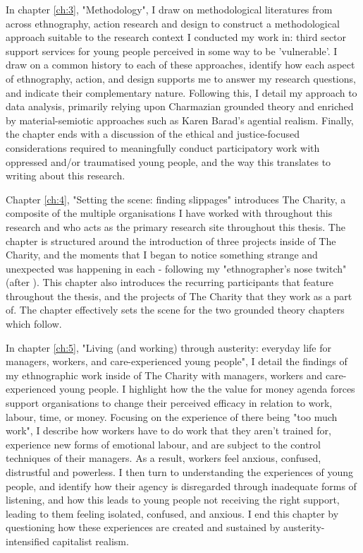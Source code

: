 In chapter \ref{ch:3}, "Methodology", I draw on methodological literatures from across ethnography, action research and design to construct a methodological approach suitable to the research context I conducted my work in: third sector support services for young people perceived in some way to be 'vulnerable'. I draw on a common history to each of these approaches, identify how each aspect of ethnography, action, and design supports me to answer my research questions, and indicate their complementary nature. Following this, I detail my approach to data analysis, primarily relying upon Charmazian grounded theory and enriched by material-semiotic approaches such as Karen Barad's agential realism. Finally, the chapter ends with a discussion of the ethical and justice-focused considerations required to meaningfully conduct participatory work with oppressed and/or traumatised young people, and the way this translates to writing about this research. 

Chapter \ref{ch:4}, "Setting the scene: finding slippages" introduces The Charity, a composite of the multiple organisations I have worked with throughout this research and who acts as the primary research site throughout this thesis. The chapter is structured around the introduction of three projects inside of The Charity, and the moments that I began to notice something strange and unexpected was happening in each - following my "ethnographer's nose twitch" (after \citet{star_ethnography_1999}). This chapter also introduces the recurring participants that feature throughout the thesis, and the projects of The Charity that they work as a part of. The chapter effectively sets the scene for the two grounded theory chapters which follow.

In chapter \ref{ch:5}, "Living (and working) through austerity: everyday life for managers, workers, and care-experienced young people", I detail the findings of my ethnographic work inside of The Charity with managers, workers and care-experienced young people. I highlight how the the value for money agenda forces support organisations to change their perceived efficacy in relation to work, labour, time, or money. Focusing on the experience of there being "too much work", I describe how workers have to do work that they aren't trained for, experience new forms of emotional labour, and are subject to the control techniques of their managers. As a result, workers feel anxious, confused, distrustful and powerless.  I then turn to understanding the experiences of young people, and identify how their agency is disregarded through inadequate forms of listening, and how this leads to young people not receiving the right support, leading to them feeling isolated, confused, and anxious. I end this chapter by questioning how these experiences are created and sustained by austerity-intensified capitalist realism.

